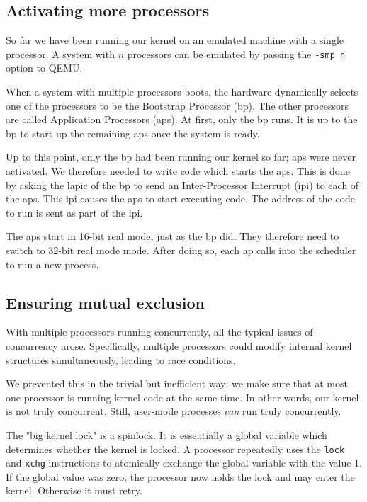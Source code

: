 \documentclass{article}
\begin{document}
\subsection{Activating more processors}
\label{sec:moreprocs}
So far we have been running our kernel on an emulated machine with a single
processor. A system with $n$ processors can be emulated by passing the
\texttt{-smp n} option to QEMU.

When a system with multiple processors boots, the hardware dynamically selects
one of the processors to be the Bootstrap Processor (\gls{bp}). The other
processors are called Application Processors (\gls{ap}s). At first, only the
\gls{bp} runs. It is up to the \gls{bp} to start up the remaining \gls{ap}s
once the system is ready.

Up to this point, only the \gls{bp} had been running our kernel so far;
\gls{ap}s were never activated. We therefore needed to write code which starts
the \gls{ap}s. This is done by asking the \gls{lapic} of the \gls{bp} to send
an Inter-Processor Interrupt (\gls{ipi}) to each of the \gls{ap}s. This
\gls{ipi} causes the \gls{ap}s to start executing code. The address of the
code to run is sent as part of the \gls{ipi}.

The \gls{ap}s start in 16-bit real mode, just as the \gls{bp} did. They
therefore need to switch to 32-bit real mode mode. After doing so, each
\gls{ap} calls into the scheduler to run a new process.


\subsection{Ensuring mutual exclusion}
With multiple processors running concurrently, all the typical issues of
concurrency arose. Specifically, multiple processors could modify internal
kernel structures simultaneously, leading to race conditions.

We prevented this in the trivial but inefficient way: we make sure that at
most one processor is running kernel code at the same time. In other words,
our kernel is not truly concurrent. Still, user-mode processes \emph{can} run
truly concurrently.

The "big kernel lock" is a spinlock. It is essentially a global variable which
determines whether the kernel is locked. A processor repeatedly uses the
\texttt{lock} and \texttt{xchg} instructions to atomically exchange the global
variable with the value 1. If the global value was zero, the processor now
holds the lock and may enter the kernel. Otherwise it must retry.
\end{document}
